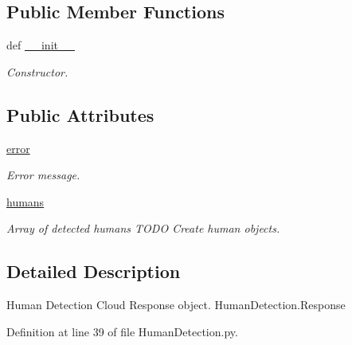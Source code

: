 \subsection*{Public Member Functions}
\begin{DoxyCompactItemize}
\item 
def \hyperlink{classRappCloud_1_1CloudMsgs_1_1HumanDetection_1_1HumanDetection_1_1Response_a28c9f545897cc290c51a483754d4947f}{\-\_\-\-\_\-init\-\_\-\-\_\-}
\begin{DoxyCompactList}\small\item\em Constructor. \end{DoxyCompactList}\end{DoxyCompactItemize}
\subsection*{Public Attributes}
\begin{DoxyCompactItemize}
\item 
\hyperlink{classRappCloud_1_1CloudMsgs_1_1HumanDetection_1_1HumanDetection_1_1Response_a66be0c82c2d662f594dd35300df8dbac}{error}
\begin{DoxyCompactList}\small\item\em Error message. \end{DoxyCompactList}\item 
\hyperlink{classRappCloud_1_1CloudMsgs_1_1HumanDetection_1_1HumanDetection_1_1Response_a3d8df09b7a9f22271055557f1b450e32}{humans}
\begin{DoxyCompactList}\small\item\em Array of detected humans T\-O\-D\-O Create human objects. \end{DoxyCompactList}\end{DoxyCompactItemize}


\subsection{Detailed Description}
\begin{DoxyVerb}Human Detection Cloud Response object. HumanDetection.Response \end{DoxyVerb}
 

Definition at line 39 of file Human\-Detection.\-py.



